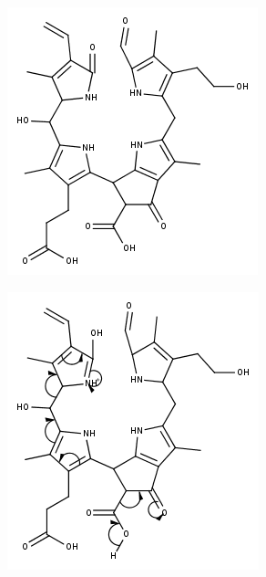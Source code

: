\begin{figure}[!htbp]
  \begin{subfigure}[b]{0.5\textwidth}
    \includegraphics[width=\textwidth]{figures/Kapitel7/Kataboliten/fragmentation_structures/VWA_Katabolit_647.png}
    \caption{}
    \label{fig:647MStruktur}
  \end{subfigure}
  \hfill
  \begin{subfigure}[b]{0.5\textwidth}
    \includegraphics[width=\textwidth]{figures/Kapitel7/Kataboliten/fragmentation_structures/VWA_Katabolit_647-CO2-RingD_480_MH_electronMovement.png}

\end{subfigure}
\end{figure}
